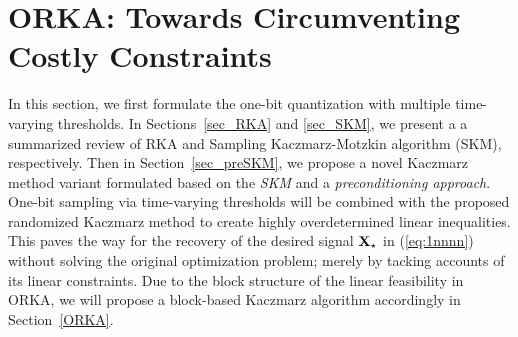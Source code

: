 \documentclass[12pt,draftcls,onecolumn]{IEEEtran}
\begin{document}
\section{ORKA: Towards Circumventing Costly Constraints }
\label{sec_3}
In this section, we first formulate the one-bit quantization with multiple time-varying thresholds. In Sections~\ref{sec_RKA} and \ref{sec_SKM}, we present a 
a summarized review of RKA and Sampling Kaczmarz-Motzkin algorithm (SKM), respectively.
Then in Section~\ref{sec_preSKM}, we propose a novel Kaczmarz method variant formulated based on the 
\emph{SKM} 
and a \emph{preconditioning approach}. One-bit sampling via time-varying thresholds will be combined with the proposed randomized Kaczmarz method to create highly overdetermined linear inequalities. This paves the way for the recovery of the desired signal $\mathbf{X}_{\star}$ in (\ref{eq:1nnnn}) without solving the original optimization problem; merely by tacking accounts of its linear constraints. 
Due to the block structure of the linear feasibility in ORKA, we will propose a block-based Kaczmarz algorithm accordingly in Section~\ref{ORKA}.
\end{document}
